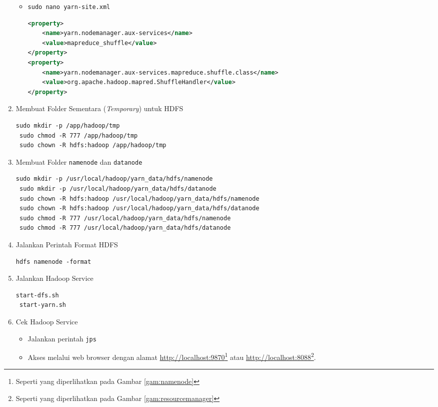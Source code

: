 \documentclass[a4paper]{tufte-handout}
\begin{document}
\begin{enumerate}
\begin{itemize}
\item {\tt sudo nano yarn-site.xml}
\begin{lstlisting}[language=XML]
<property>
	<name>yarn.nodemanager.aux-services</name>
	<value>mapreduce_shuffle</value>
</property>
<property>
	<name>yarn.nodemanager.aux-services.mapreduce.shuffle.class</name>
	<value>org.apache.hadoop.mapred.ShuffleHandler</value>
</property>
\end{lstlisting}
\end{itemize}

\item Membuat Folder Sementara (\textit{Temporary}) untuk HDFS
\begin{lstlisting}[language=Terminal]
 sudo mkdir -p /app/hadoop/tmp
 sudo chmod -R 777 /app/hadoop/tmp
 sudo chown -R hdfs:hadoop /app/hadoop/tmp
\end{lstlisting}

\item Membuat Folder {\tt namenode} dan {\tt datanode}
\begin{lstlisting}[language=Terminal]
 sudo mkdir -p /usr/local/hadoop/yarn_data/hdfs/namenode
 sudo mkdir -p /usr/local/hadoop/yarn_data/hdfs/datanode
 sudo chown -R hdfs:hadoop /usr/local/hadoop/yarn_data/hdfs/namenode
 sudo chown -R hdfs:hadoop /usr/local/hadoop/yarn_data/hdfs/datanode
 sudo chmod -R 777 /usr/local/hadoop/yarn_data/hdfs/namenode
 sudo chmod -R 777 /usr/local/hadoop/yarn_data/hdfs/datanode
\end{lstlisting}

\item Jalankan Perintah Format HDFS
\begin{lstlisting}[language=Terminal]
 hdfs namenode -format
\end{lstlisting}

\item Jalankan Hadoop Service
\begin{lstlisting}[language=Terminal]
 start-dfs.sh
 start-yarn.sh
\end{lstlisting}

\clearpage
\item Cek Hadoop Service
\begin{itemize}
\item Jalankan perintah {\tt jps}
\item Akses melalui web browser dengan alamat \url{http://localhost:9870}\footnote{Seperti yang diperlihatkan pada Gambar \ref{gam:namenode}} atau \url{http://localhost:8088}\footnote{Seperti yang diperlihatkan pada Gambar \ref{gam:resourcemanager}}.
\end{itemize}


\end{enumerate}
\end{document}
